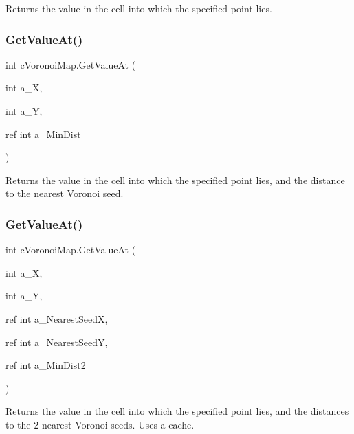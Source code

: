 Returns the value in the cell into which the specified point lies. \mbox{\label{classc_voronoi_map_ae9b7f43fdbdefbcc6345ffcd93972575}} 
\subsubsection{\texorpdfstring{Get\+Value\+At()}{GetValueAt()}\hspace{0.1cm}{\footnotesize\ttfamily [2/3]}}
{\footnotesize\ttfamily int c\+Voronoi\+Map.\+Get\+Value\+At (\begin{DoxyParamCaption}\item[{int}]{a\+\_\+X,  }\item[{int}]{a\+\_\+Y,  }\item[{ref int}]{a\+\_\+\+Min\+Dist }\end{DoxyParamCaption})\hspace{0.3cm}{\ttfamily [inline]}}

Returns the value in the cell into which the specified point lies, and the distance to the nearest Voronoi seed. \mbox{\label{classc_voronoi_map_ae3363ea6fa041e1e59701173a9b26f34}} 
\subsubsection{\texorpdfstring{Get\+Value\+At()}{GetValueAt()}\hspace{0.1cm}{\footnotesize\ttfamily [3/3]}}
{\footnotesize\ttfamily int c\+Voronoi\+Map.\+Get\+Value\+At (\begin{DoxyParamCaption}\item[{int}]{a\+\_\+X,  }\item[{int}]{a\+\_\+Y,  }\item[{ref int}]{a\+\_\+\+Nearest\+SeedX,  }\item[{ref int}]{a\+\_\+\+Nearest\+SeedY,  }\item[{ref int}]{a\+\_\+\+Min\+Dist2 }\end{DoxyParamCaption})\hspace{0.3cm}{\ttfamily [inline]}}

Returns the value in the cell into which the specified point lies, and the distances to the 2 nearest Voronoi seeds. Uses a cache. \mbox{\label{classc_voronoi_map_a8764d5ec75eb46d721d10f9d4369bfb9}} 
